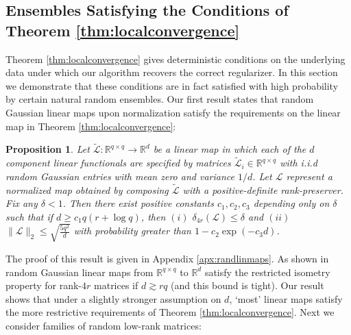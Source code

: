 \documentclass[11pt,letterpaper]{article}
\newtheorem{proposition}[theorem]{Proposition}
\newcommand{\R}{\mathbb{R}}
\renewcommand{\L}{\mathcal{L}}
\begin{document}

\subsection{Ensembles Satisfying the Conditions of Theorem \ref{thm:localconvergence}} \label{sec:analysis_randensemble}

Theorem \ref{thm:localconvergence} gives deterministic conditions on the underlying data under which our algorithm recovers the correct regularizer.  In this section we demonstrate that these conditions are in fact satisfied with high probability by certain natural random ensembles.  Our first result states that random Gaussian linear maps upon normalization satisfy the requirements on the linear map in Theorem \ref{thm:localconvergence}:

\begin{proposition}\label{thm:gaussianmapsatisfy}
Let $\tilde{\L} : \R^{q \times q} \rightarrow \R^d$ be a linear map in which each of the $d$ component linear functionals are specified by matrices $\tilde{\L}_{i} \in \R^{q \times q}$ with i.i.d random Gaussian entries with mean zero and variance $1/d$.  Let $\L$ represent a normalized map obtained by composing $\tilde{\L}$ with a positive-definite rank-preserver.  Fix any $\delta <1$.  Then there exist positive constants $c_1,c_2,c_3$ depending only on $\delta$ such that if $d \geq c_1 q(r + \log q)$, then $(i)$ $\delta_{4r}(\L) \leq \delta$ and $(ii)$ $\|\L\|_2 \leq \sqrt{\frac{5q^2}{d}}$ with probability greater than $1 - c_2\exp(-c_3 d)$.
\end{proposition}

The proof of this result is given in Appendix \ref{apx:randlinmaps}.  As shown in \cite{CanPla:11} random Gaussian linear maps from $\R^{q \times q}$ to $\R^d$ satisfy the restricted isometry property for rank-$4r$ matrices if $d \gtrsim rq$ (and this bound is tight).  Our result shows that under a slightly stronger assumption on $d$, `most' linear maps satisfy the more restrictive requirements of Theorem \ref{thm:localconvergence}.  Next we consider families of random low-rank matrices:
\end{document}
